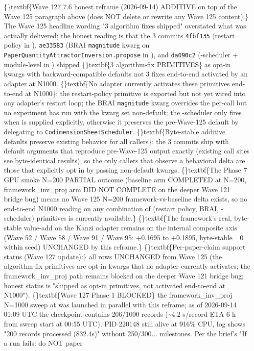 \documentclass{article}
\begin{document}
\{\}textbf\{Wave 127 7.6 honest reframe (2026-09-14)  ADDITIVE on top of the Wave 125 paragraph above (does NOT delete or rewrite any Wave 125 content).\} The Wave 125 headline wording "3 algorithm fixes shipped" overstated what was actually delivered; the honest reading is that the 3 commits \texttt{4fbf135} (restart policy  in ), \texttt{ae33583} (BRAI \texttt{magnitude} kwarg on \texttt{PaperQuantityAttractorInversion.propose} in ), and \texttt{da090c2} (-scheduler  + module-level  in ) shipped \{\}textbf\{3 algorithm-fix PRIMITIVES\} as opt-in kwargs with backward-compatible defaults  not 3 fixes end-to-end activated by an adapter at N1000. \{\}textbf\{No adapter currently activates these primitives end-to-end at N1000\}: the restart-policy primitive  is exported but not yet wired into any adapter's restart loop; the BRAI \texttt{magnitude} kwarg overrides the per-call  but no experiment has run with the kwarg set non-default; the -scheduler  only fires when  is supplied explicitly, otherwise it preserves the pre-Wave-125 default by delegating to \texttt{CodimensionSheetScheduler}. \{\}textbf\{Byte-stable additive defaults preserve existing behavior for all callers\}: the 3 commits ship with default arguments that reproduce pre-Wave-125 output exactly (existing call sites see byte-identical results), so the only callers that observe a behavioral delta are those that explicitly opt in by passing non-default kwargs. \{\}textbf\{The Phase 7 GPU smoke N=200 PARTIAL outcome (baseline arm COMPLETED at N=200, framework\_inv\_proj arm DID NOT COMPLETE on the deeper Wave 121 bridge bug) means no Wave 125 N=200 framework-vs-baseline delta exists, so no end-to-end N1000 reading on any combination of (restart policy, BRAI, -scheduler) primitives is currently available.\} \{\}textbf\{The framework's real, byte-stable value-add on the Kanzi adapter remains on the internal composite axis (Wave 52 / Wave 58 / Wave 91 / Wave 95: +0.1695 to +0.1895, byte-stable =0 within seed)  UNCHANGED by this reframe.\} \{\}textbf\{Per-paper-claim support status (Wave 127 update):\} all rows UNCHANGED from Wave 125 (the algorithm-fix primitives are opt-in kwargs that no adapter currently activates; the framework\_inv\_proj path remains blocked on the deeper Wave 121 bridge bug; honest status is "shipped as opt-in primitives, not activated end-to-end at N1000"). \{\}textbf\{Wave 127 Phase 1 BLOCKED\}  the framework\_inv\_proj N=1000 sweep at  was launched in parallel with this reframe; as of 2026-09-14 01:09 UTC the checkpoint contains 206/1000 records (\textasciitilde{}4.2 s/record  ETA  6 h from sweep start at 00:55 UTC), PID 220148 still alive at 916\% CPU, log shows "200 records processed (832.4s)" without 250/300... milestones. Per the brief's "If a run fails: do NOT paper 
\end{document}
